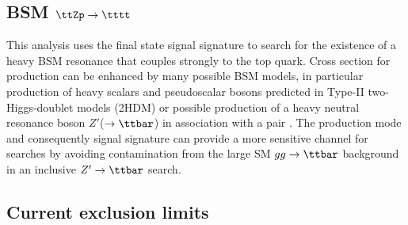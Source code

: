 \documentclass[../thesis.tex]{subfiles}
\begin{document}
\subsection{\acs{BSM} $\ttZp\rightarrow\tttt$}
\label{sec:BSM4top}

This analysis uses the \tttt final state signal signature to search for the existence of a heavy \acs{BSM} resonance that couples strongly to the top quark. Cross section for \tttt production can be enhanced by many possible \acs{BSM} models, in particular production of heavy scalars and pseudoscalar bosons predicted in Type-II two-Higgs-doublet models (\acs{2HDM}) \citep{Craig:2015jba,Craig_2017,Branco:2011iw,PhysRevD.93.075038,higgscomp} or possible production of a heavy neutral resonance boson $Z'$($\rightarrow\ttbar$) in association with a \ttbar pair \citep{Ferretti:2013kya,Vecchi:2015fma}. The \ttZp production mode and consequently \tttt signal signature can provide a more sensitive channel for searches by avoiding contamination from the large \acs{SM} $gg\rightarrow \ttbar$ background in an inclusive $Z'\rightarrow\ttbar$ search.

\subsection{Current exclusion limits}
\end{document}
